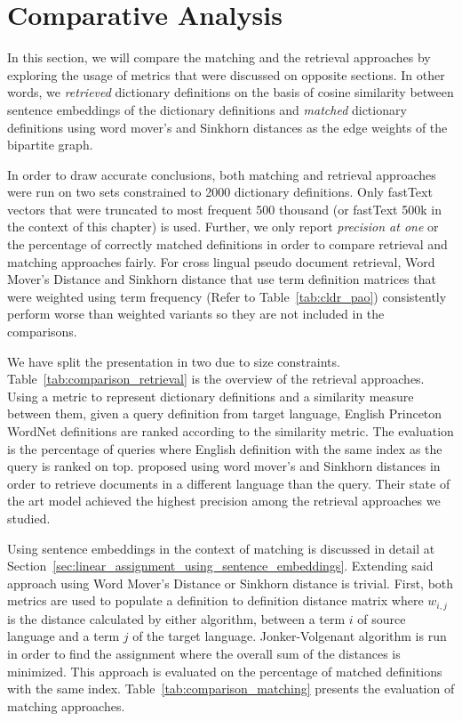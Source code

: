 \section{Comparative Analysis}%
\label{sec:comparative_analysis}

In this section, we will compare the matching and the retrieval approaches by exploring the usage of metrics that were discussed on opposite sections.
In other words, we \emph{retrieved} dictionary definitions on the basis of cosine similarity between sentence embeddings of the dictionary definitions and \emph{matched} dictionary definitions using word mover's and Sinkhorn distances as the edge weights of the bipartite graph.

In order to draw accurate conclusions, both matching and retrieval approaches were run on two sets constrained to 2000 dictionary definitions.
Only fastText vectors that were truncated to most frequent 500 thousand (or fastText 500k in the context of this chapter) is used.
Further, we only report \emph{precision at one} or the percentage of correctly matched definitions in order to compare retrieval and matching approaches fairly.
For cross lingual pseudo document retrieval, Word Mover's Distance and Sinkhorn distance that use term definition matrices that were weighted using term frequency (Refer to Table~\ref{tab:cldr_pao}) consistently perform worse than \tfidf{} weighted variants so they are not included in the comparisons.

We have split the presentation in two due to size constraints.
Table~\ref{tab:comparison_retrieval} is the overview of the retrieval approaches.
Using a metric to represent dictionary definitions and a similarity measure between them, given a query definition from target language, English Princeton WordNet definitions are ranked according to the similarity metric.
The evaluation is the percentage of queries where English definition with the same index as the query is ranked on top.
\textcite{balikasCrosslingual2018} proposed using word mover's and Sinkhorn distances in order to retrieve documents in a different language than the query.
Their state of the art model achieved the highest precision among the retrieval approaches we studied.

Using sentence embeddings in the context of matching is discussed in detail at Section~\ref{sec:linear_assignment_using_sentence_embeddings}.
Extending said approach using Word Mover's Distance or Sinkhorn distance is trivial.
First, both metrics are used to populate a definition to definition distance matrix where $w_{i,j}$ is the distance calculated by either algorithm, between a term $i$ of source language and a term $j$ of the target language.
Jonker-Volgenant algorithm is run in order to find the assignment where the overall sum of the distances is minimized.
This approach is evaluated on the percentage of matched definitions with the same index.
Table~\ref{tab:comparison_matching} presents the evaluation of matching approaches.

